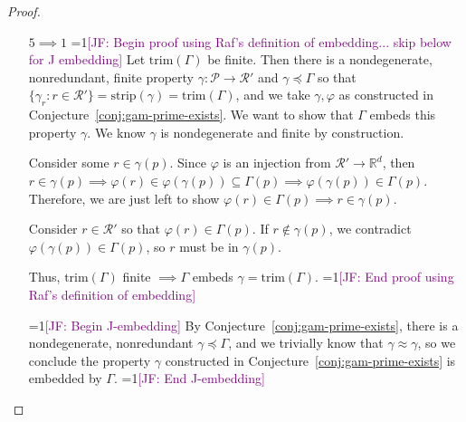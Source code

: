 \documentclass[12pt]{article}
\newcommand{\Comments}{1}
\newcommand{\mynote}[2]{\ifnum\Comments=1\textcolor{#1}{#2}\fi}
\newcommand{\jessie}[1]{\mynote{purple}{[JF: #1]}}
\newcommand{\reals}{\mathbb{R}}
\renewcommand{\P}{\mathcal{P}}
\newcommand{\R}{\mathcal{R}}
\newcommand{\trim}{\mathrm{trim}}
\newcommand{\strip}{\mathrm{strip}}
\newcommand{\card}{\textbf{card}}
\begin{document}
\begin{proof}
\begin{enumerate}
\item[$5 \implies 1$] 
\jessie{Begin proof using Raf's definition of embedding... skip below for J embedding}
Let $\trim(\Gamma)$ be finite.
Then there is a nondegenerate, nonredundant, finite property $\gamma: \P \to \R'$ and $\gamma \preceq \Gamma$ so that $\{ \gamma_r : r \in \R' \} = \strip(\gamma) = \trim(\Gamma)$, and we take $\gamma, \varphi$ as constructed in Conjecture~\ref{conj:gam-prime-exists}.
We want to show that $\Gamma$ embeds this property $\gamma$.
We know $\gamma$ is nondegenerate and finite by construction.


Consider some $r \in \gamma(p)$.
Since $\varphi$ is an injection from $\R' \to \reals^d$, then $r \in \gamma(p) \implies \varphi(r) \in \varphi(\gamma(p)) \subseteq \Gamma(p) \implies \varphi(\gamma(p)) \in \Gamma(p)$.
Therefore, we are just left to show $\varphi(r) \in \Gamma(p) \implies r \in \gamma(p)$.

Consider $r \in \R'$ so that $\varphi(r) \in \Gamma(p)$.
If $r \not \in \gamma(p)$, we contradict $\varphi(\gamma(p)) \in \Gamma(p)$, so $r$ must be in $\gamma(p)$.

Thus, $\trim(\Gamma)$ finite $\implies \Gamma$ embeds $\gamma = \trim(\Gamma)$.
\jessie{End proof using Raf's definition of embedding}

\jessie{Begin J-embedding}
By Conjecture~\ref{conj:gam-prime-exists}, there is a nondegenerate, nonredundant $\gamma \preceq \Gamma$, and we trivially know that $\gamma \approx \gamma$, so we conclude the property $\gamma$ constructed in Conjecture~\ref{conj:gam-prime-exists} is embedded by $\Gamma$.
\jessie{End J-embedding}



%



\end{enumerate}
\end{proof}
\end{document}
